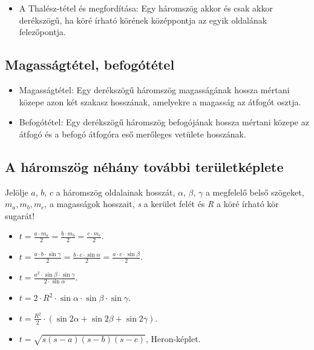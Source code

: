 \documentclass[a4paper,11pt]{article}
\begin{document}
\setcounter{page}{4}
\begin{itemize}
\item A Thalész-tétel és megfordítása: Egy háromszög akkor és csak akkor derékszögű, ha köré írható körének középpontja az egyik oldalának felezőpontja.
\end{itemize}
\subsection*{\textbf{Magasságtétel, befogótétel}}
\begin{itemize}
\item Magasságtétel: Egy derékszögű háromszög magasságának hossza mértani közepe azon két szakasz hosszának, amelyekre a magasság az átfogót osztja.
\item Befogótétel: Egy derékszögű háromszög befogójának hossza mértani közepe az átfogó és a befogó átfogóra eső merőleges vetülete hosszának.
\end{itemize}
\subsection*{A háromszög néhány további területképlete}
\begin{list}{}{\leftmargin=1.5em}
\item Jelölje $a$, $b$, $c$ a háromszög oldalainak hosszát, $\alpha$, $\beta$, $\gamma$ a megfelelő belső szögeket, $m_a, m_b, m_c$, a magasságok hosszait, \textit{s} a kerület felét és \textit{R} a köré írható kör sugarát!
\end{list}
\begin{itemize}
\item $ t = \frac{a \cdot m_a}{2} = \frac{b \cdot m_b}{2} = \frac{c \cdot m_c}{2}$.
\item $ t = \frac{a \cdot b \cdot \sin\!\gamma} {2} = \frac{b \cdot c \cdot \sin\!\alpha} {2} = \frac{a \cdot c \cdot \sin\!\beta} {2}$.
\item $t = \frac{a^2 \cdot \sin\!\beta \cdot \sin\!\gamma}{2 \cdot \sin\!\alpha}$.
\item $t = 2 \cdot R^2 \cdot \sin\!\alpha \cdot \sin\!\beta \cdot \sin\!\gamma$.
\item $t = \frac{R^2}{2} \cdot (\sin\!2\alpha + \sin\!2\beta + \sin\!2\gamma)$.
\item $t = \sqrt{s(s-a)(s-b)(s-c)}$, Heron-képlet.
\end{itemize}
\end{document}
